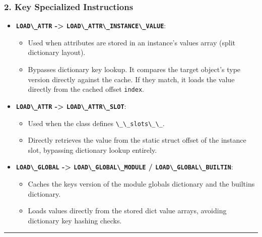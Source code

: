 \hypertarget{key-specialized-instructions}{%
\subsubsection{2. Key Specialized
Instructions}\label{key-specialized-instructions}}

\begin{itemize}
\tightlist
\item
  \textbf{\passthrough{\lstinline!LOAD\_ATTR!} -\textgreater{}
  \passthrough{\lstinline!LOAD\_ATTR\_INSTANCE\_VALUE!}}:

  \begin{itemize}
  \tightlist
  \item
    Used when attributes are stored in an instance's values array (split
    dictionary layout).
  \item
    Bypasses dictionary key lookup. It compares the target object's type
    version directly against the cache. If they match, it loads the
    value directly from the cached offset
    \passthrough{\lstinline!index!}.
  \end{itemize}
\item
  \textbf{\passthrough{\lstinline!LOAD\_ATTR!} -\textgreater{}
  \passthrough{\lstinline!LOAD\_ATTR\_SLOT!}}:

  \begin{itemize}
  \tightlist
  \item
    Used when the class defines \passthrough{\lstinline!\_\_slots\_\_!}.
  \item
    Directly retrieves the value from the static struct offset of the
    instance slot, bypassing dictionary lookup entirely.
  \end{itemize}
\item
  \textbf{\passthrough{\lstinline!LOAD\_GLOBAL!} -\textgreater{}
  \passthrough{\lstinline!LOAD\_GLOBAL\_MODULE!} /
  \passthrough{\lstinline!LOAD\_GLOBAL\_BUILTIN!}}:

  \begin{itemize}
  \tightlist
  \item
    Caches the keys version of the module globals dictionary and the
    builtins dictionary.
  \item
    Loads values directly from the stored dict value arrays, avoiding
    dictionary key hashing checks.
  \end{itemize}
\end{itemize}

\begin{center}\rule{0.5\linewidth}{0.5pt}\end{center}

